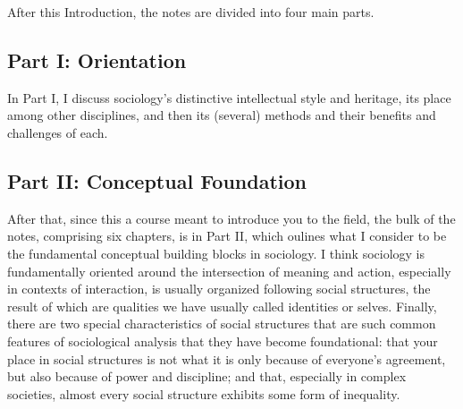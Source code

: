 \documentclass[
  letterpaper,
  DIV=11,
  numbers=noendperiod,
  oneside]{scrartcl}
\begin{document}
After this Introduction, the notes are divided into four main parts.

\subsection{Part I: Orientation}\label{part-i-orientation}

In Part I, I discuss sociology's distinctive intellectual style and
heritage, its place among
other disciplines, and then its
(several) methods and their benefits and challenges of each.

\subsection{Part II: Conceptual
Foundation}\label{part-ii-conceptual-foundation}

After that, since this a course meant to introduce you to the field, the
bulk of the notes, comprising six chapters, is in Part II, which oulines
what I consider to be the fundamental conceptual building blocks in
sociology. I think sociology is fundamentally oriented around the
intersection of meaning and action, especially in
contexts of interaction, is usually
organized following social structures, the result
of which are qualities we have usually called identities or
selves. Finally, there are two
special characteristics of social structures that are such common
features of sociological analysis that they have become foundational:
that your place in social structures is not what it is only because of
everyone's agreement, but also because of power and
discipline; and
that, especially in complex societies, almost every social structure
exhibits some form of inequality.
\end{document}
